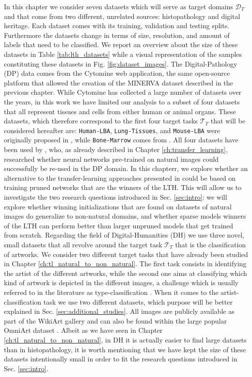 In this chapter we consider seven datasets which will serve as target domains $\mathcal{D}_T$ and that come from two different, unrelated sources: histopathology and digital heritage. Each dataset comes with its training, validation and testing splits. Furthermore the datasets change in terms of size, resolution, and amount of labels that need to be classified. We report an overview about the size of these datasets in Table \ref{tab:lth_datasets} while a visual representation of the samples constituting these datasets in Fig. \ref{fig:dataset_images}.
The Digital-Pathology (DP) data comes from the Cytomine \cite{maree2016collaborative} web application, the same open-source platform that allowed the creation of the MINERVA dataset described in the previous chapter. While Cytomine has collected a large number of datasets over the years, in this work we have limited our analysis to a subset of four datasets that all represent tissues and cells from either human or animal organs. These datasets, which therefore correspond to the first four target tasks $\mathcal{T}_T$ that will be considered hereafter are: \texttt{Human-LBA}, \texttt{Lung-Tissues}, and \texttt{Mouse-LBA} were originally proposed in \cite{mormont2018comparison}, while \texttt{Bone-Marrow} comes from \cite{kainz2017training}. All four datasets have been used by \citet{mormont2018comparison}, who, as already described in Chapter \ref{ch:transfer_learning}, researched whether neural networks pre-trained on natural images could successfully be re-used in the DP domain. In this chapterr, we explore whether an alternative to the transfer-learning approaches presented in \cite{mormont2018comparison} could be based on training pruned networks that are the winners of the LTH. This will allow us to investigate the two research questions introduced in Sec. \ref{sec:intro}: we will explore whether winning initializations that are found on datasets of natural images do generalize to non-natural domains, and whether sparse models winners of the LTH can perform better than larger unpruned models that get trained from scratch. 
Regarding the field of Digital-Humanities (DH) we use three novel, small datasets that all revolve around the target task $\mathcal{T}_T$ that is the classification of artworks. We consider two different target tasks that have already been studied in Chapter \ref{ch:tl_natural_to_non_natural}. The first task consists in identifying the artist of the different artworks, while the second one aims at classifying which kind of artwork is depicted in the different images, a challenge which is usually referred to in the literature as type-classification \cite{mensink2014rijksmuseum,sabatelli2018deep}. When it comes to the artist-classification task we use two different datasets, which purpose will be better explained in Sec. \ref{sec:additional_studies}. All images are publicly available as part of the WikiArt gallery \cite{phillips2011wiki} and can also be found within the large popular OmniArt dataset \cite{strezoski2018omniart}. Albeit as we have seen in Chapter \ref{ch:tl_natural_to_non_natural}, in DH it is actually easier to find large datasets than in histopathology, it is worth mentioning that we have kept the size of these datasets intentionally small in order to fit the research questions introduced in Sec. \ref{sec:intro}. 
